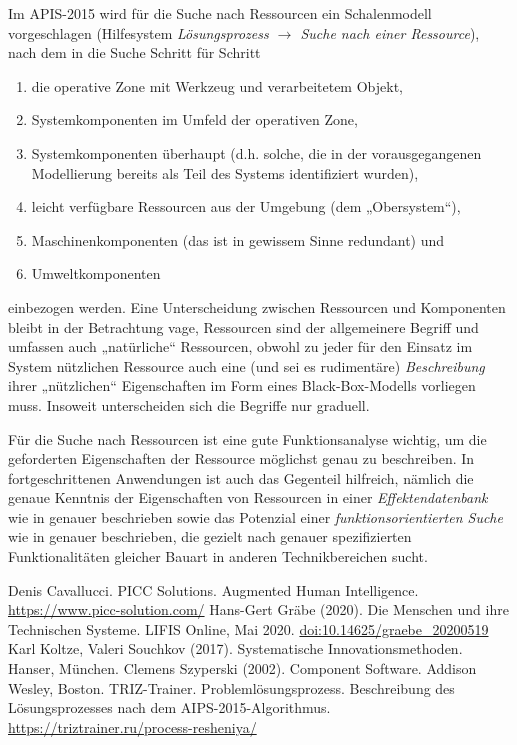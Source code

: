 \documentclass[11pt,a4paper]{article}
\begin{document}
Im APIS-2015 wird für die Suche nach Ressourcen ein Schalenmodell
vorgeschlagen (Hilfesystem \emph{Lösungsprozess $\to$ Suche nach einer
  Ressource}), nach dem in die Suche Schritt für Schritt
\begin{enumerate}[noitemsep]
\item die operative Zone mit Werkzeug und verarbeitetem Objekt,
\item Systemkomponenten im Umfeld der operativen Zone,
\item Systemkomponenten überhaupt (d.h. solche, die in der vorausgegangenen
  Modellierung bereits als Teil des Systems identifiziert wurden),
\item leicht verfügbare Ressourcen aus der Umgebung (dem „Obersystem“),
\item Maschinenkomponenten (das ist in gewissem Sinne redundant) und
\item Umweltkomponenten
\end{enumerate}
einbezogen werden. Eine Unterscheidung zwischen Ressourcen und Komponenten
bleibt in der Betrachtung vage, Ressourcen sind der allgemeinere Begriff und
umfassen auch „natürliche“ Ressourcen, obwohl zu jeder für den Einsatz im
System nützlichen Ressource auch eine (und sei es rudimentäre)
\emph{Beschreibung} ihrer „nützlichen“ Eigenschaften im Form eines
Black-Box-Modells vorliegen muss. Insoweit unterscheiden sich die Begriffe nur
graduell. 

Für die Suche nach Ressourcen ist eine gute Funktionsanalyse \cite[Abschnitt
  4.4]{Koltze2017} wichtig, um die geforderten Eigenschaften der Ressource
möglichst genau zu beschreiben.  In fortgeschrittenen Anwendungen ist auch das
Gegenteil hilfreich, nämlich die genaue Kenntnis der Eigenschaften von
Ressourcen in einer \emph{Effektendatenbank} wie in \cite[Abschnitt
  8.2]{Koltze2017} genauer beschrieben sowie das Potenzial einer
\emph{funktionsorientierten Suche} wie in \cite[Abschnitt 4.14]{Koltze2017}
genauer beschrieben, die gezielt nach genauer spezifizierten Funktionalitäten
gleicher Bauart in anderen Technikbereichen sucht. 
\newpage

\begin{thebibliography}{xxx}
 Denis Cavallucci. PICC Solutions. Augmented Human
  Intelligence.  \url{https://www.picc-solution.com/}
 Hans-Gert Gräbe (2020). Die Menschen und ihre Technischen
  Systeme. LIFIS Online, Mai 2020. \url{doi:10.14625/graebe_20200519}
 Karl Koltze, Valeri Souchkov (2017). Systematische
  Innovationsmethoden. Hanser, München. 
 Clemens Szyperski (2002). Component Software. Addison
  Wesley, Boston. 
 TRIZ-Trainer.
  Problemlösungsprozess.  Beschreibung des Lösungsprozesses nach dem
  AIPS-2015-Algorithmus.  \url{https://triztrainer.ru/process-resheniya/}
\end{thebibliography}
\end{document}
